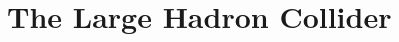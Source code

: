 %


\section{The Large Hadron Collider}

%
%
%
%



%
%
%
%
%
%
%
%
%
%
%
%
%
%
%
%
%
%
%
%

%
%
%
%










%
%

